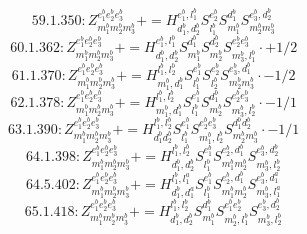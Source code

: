 \documentclass[letterpaper,10pt,fleqn,leqno,onecolumn]{article}
\begin{document}
\begin{equation} \;\;\;\;\;\;  59.1.350: Z^{e_{1}^{b}e_{2}^{b}e_{3}^{b}}_{m_{1}^{b}m_{2}^{b}m_{3}^{b}}+=H^{e_{1}^{b},l_{1}^{b}}_{d_{1}^{b},d_{2}^{b}}S^{e_{2}^{b}}_{l_{1}^{b}}S^{d_{1}^{b}}_{m_{1}^{b}}S^{e_{3}^{b},d_{2}^{b}}_{m_{2}^{b}m_{3}^{b}} \end{equation}
\begin{equation} \;\;\;\;\;\;  60.1.362: Z^{e_{1}^{b}e_{2}^{b}e_{3}^{b}}_{m_{1}^{b}m_{2}^{b}m_{3}^{b}}+=H^{e_{1}^{b},l_{1}^{b}}_{d_{1}^{b},d_{2}^{b}}S^{d_{1}^{b}}_{m_{1}^{b}}S^{d_{2}^{b}}_{m_{2}^{b}}S^{e_{2}^{b}e_{3}^{b}}_{m_{3}^{b},l_{1}^{b}}\cdot +1/2 \end{equation}
\begin{equation} \;\;\;\;\;\;  61.1.370: Z^{e_{1}^{b}e_{2}^{b}e_{3}^{b}}_{m_{1}^{b}m_{2}^{b}m_{3}^{b}}+=H^{l_{1}^{b},l_{2}^{b}}_{m_{1}^{b},d_{1}^{b}}S^{e_{1}^{b}}_{l_{1}^{b}}S^{e_{2}^{b}}_{l_{2}^{b}}S^{e_{3}^{b},d_{1}^{b}}_{m_{2}^{b}m_{3}^{b}}\cdot -1/2 \end{equation}
\begin{equation} \;\;\;\;\;\;  62.1.378: Z^{e_{1}^{b}e_{2}^{b}e_{3}^{b}}_{m_{1}^{b}m_{2}^{b}m_{3}^{b}}+=H^{l_{1}^{b},l_{2}^{b}}_{m_{1}^{b},d_{1}^{b}}S^{e_{1}^{b}}_{l_{1}^{b}}S^{d_{1}^{b}}_{m_{2}^{b}}S^{e_{2}^{b}e_{3}^{b}}_{m_{3}^{b},l_{2}^{b}}\cdot -1/1 \end{equation}
\begin{equation} \;\;\;\;\;\;  63.1.390: Z^{e_{1}^{b}e_{2}^{b}e_{3}^{b}}_{m_{1}^{b}m_{2}^{b}m_{3}^{b}}+=H^{l_{1}^{b},l_{2}^{b}}_{d_{1}^{b}d_{2}^{b}}S^{e_{1}^{b}}_{l_{1}^{b}}S^{e_{2}^{b}e_{3}^{b}}_{m_{1}^{b},l_{2}^{b}}S^{d_{1}^{b}d_{2}^{b}}_{m_{2}^{b}m_{3}^{b}}\cdot -1/1 \end{equation}
\begin{equation} \;\;\;\;\;\;  64.1.398: Z^{e_{1}^{b}e_{2}^{b}e_{3}^{b}}_{m_{1}^{b}m_{2}^{b}m_{3}^{b}}+=H^{l_{1}^{b},l_{2}^{b}}_{d_{1}^{b},d_{2}^{b}}S^{e_{1}^{b}}_{l_{1}^{b}}S^{e_{2}^{b},d_{1}^{b}}_{m_{1}^{b}m_{2}^{b}}S^{e_{3}^{b},d_{2}^{b}}_{m_{3}^{b},l_{2}^{b}} \end{equation}
\begin{equation} \;\;\;\;\;\;  64.5.402: Z^{e_{1}^{b}e_{2}^{b}e_{3}^{b}}_{m_{1}^{b}m_{2}^{b}m_{3}^{b}}+=H^{l_{1}^{b},l_{1}^{a}}_{d_{1}^{b},d_{1}^{a}}S^{e_{1}^{b}}_{l_{1}^{b}}S^{e_{2}^{b},d_{1}^{b}}_{m_{1}^{b}m_{2}^{b}}S^{e_{3}^{b},d_{1}^{a}}_{m_{3}^{b},l_{1}^{a}} \end{equation}
\begin{equation} \;\;\;\;\;\;  65.1.418: Z^{e_{1}^{b}e_{2}^{b}e_{3}^{b}}_{m_{1}^{b}m_{2}^{b}m_{3}^{b}}+=H^{l_{1}^{b},l_{2}^{b}}_{d_{1}^{b},d_{2}^{b}}S^{d_{1}^{b}}_{m_{1}^{b}}S^{e_{1}^{b}e_{2}^{b}}_{m_{2}^{b},l_{1}^{b}}S^{e_{3}^{b},d_{2}^{b}}_{m_{3}^{b},l_{2}^{b}} \end{equation}
\end{document}
